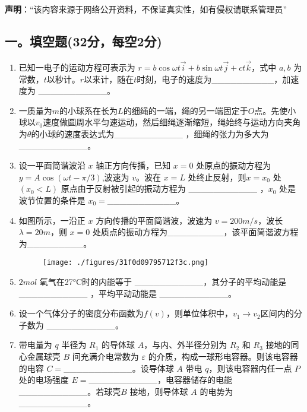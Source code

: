 
\textbf{声明}：“该内容来源于网络公开资料，不保证真实性，如有侵权请联系管理员”

\subsection{一。填空题(32分，每空2分)}
\begin{enumerate}
    \item 已知一电子的运动方程可表示为 $r = b \cos \omega t\vec{i} + b \sin \omega t\vec{j} + ct\vec{k}$，式中 $a,b$ 为常数，$t$以秒计。$r$以来计，随在$t$时刻，电子的速度为__________，加速度为 ___________。
    \item 一质量为$m$的小球系在长为$L$的细绳的一端，绳的另一端固定于$O$点。先使小球以$v_0$速度做圆周水平匀速运动，然后细绳逐渐缩短，绳始终与运动方向夹角为$\theta$的小球的速度表达式为___________ ，细绳的张力为多大为 ___________。
    \item 设一平面简谐波沿 $x$ 轴正方向传播，已知 $x=0$ 处原点的振动方程为$ y = A \cos(\omega t - \pi/3)$,波速为 $v$。波在 $x=L$ 处终止反射，则$x=x_0$ 处 $(x_0 < L)$ 原点由于反射被引起的振动方程为 ___________ ，$x_0$ 处是波节位置的条件是 $x_0 =$___________。
    \item 如图所示，一沿正 $x$ 方向传播的平面简谐波，波速为 $v = 200 m/s$，波长 $\lambda = 20 m$，则 $x = 0$ 处质点的振动方程为_________，该平面简谐波方程为_________。
\begin{figure}[ht]
\centering
\texttt{[image: ./figures/31f0d09795712f3c.png]}
\caption{} \label{fig_NJU10_1}
\end{figure}
    \item $2 mol$ 氧气在27°C时的内能等于 ___________，其分子的平均动能是 ___________ ，平均平动动能是 ___________。
    \item 设一个气体分子的密度分布函数为$f(v)$，则单位体积中，$v_1\to v_2$区间内的分子数为 ___________。
    \item 带电量为 $q$ 半径为 $R_1$ 的导体球 $A$，与内、外半径分别为 $R_2$ 和 $R_3$ 接地的同心金属球壳 $B$ 间充满介电常数为 $\varepsilon$ 的介质，构成一球形电容器。则该电容器的电容 $C=$___________。设导体球 $A$ 带电 $q$，则该电容器内任一点 $P$ 处的电场强度 $E=$___________，电容器储存的电能___________。若球壳$B$ 接地，则导体球 $A$ 的电势为 ___________。
\end{enumerate}

